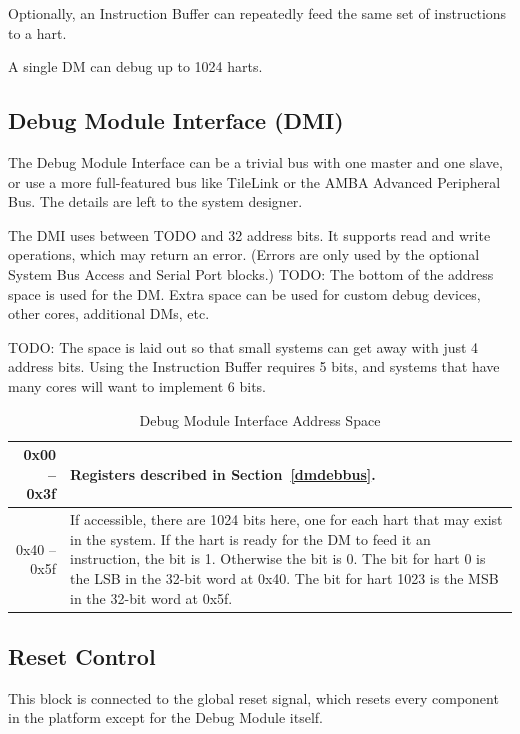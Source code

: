 \documentclass{article}
\begin{document}
Optionally, an Instruction Buffer can repeatedly feed the same set of
instructions to a hart.

A single DM can debug up to 1024 harts.

\subsection{Debug Module Interface (DMI)}

The Debug Module Interface can be a trivial bus with one master and one slave,
or use a more full-featured bus like TileLink or the AMBA Advanced Peripheral
Bus. The details are left to the system designer.

The DMI uses between TODO and 32 address bits.  It supports read and write
operations, which may return an error. (Errors are only used by the optional
System Bus Access and Serial Port blocks.) TODO: The bottom of the address space is
used for the DM. Extra space can be used for custom debug devices, other cores,
additional DMs, etc.

TODO: The space is laid out so that small systems can get away with just 4
address bits. Using the Instruction Buffer requires 5 bits, and systems that
have many cores will want to implement 6 bits.

\begin{table}[htp]
    \centering
    \caption{Debug Module Interface Address Space}
    \label{tab:header}
    \begin{tabulary}{\textwidth}{|r|L|}
        \hline
        0x00 -- 0x3f & Registers described in Section~\ref{dmdebbus}. \\
        \hline
        0x40 -- 0x5f & If accessible, there are 1024 bits here, one for each
        hart that may exist in the system. If the hart is ready for the DM to
        feed it an instruction, the bit is 1. Otherwise the bit is 0. The bit
        for hart 0 is the LSB in the 32-bit word at 0x40. The bit for hart 1023
        is the MSB in the 32-bit word at 0x5f. \\
        \hline
    \end{tabulary}
\end{table}

\subsection{Reset Control} \label{reset}

This block is connected to the global reset signal, which resets every
component in the platform except for the Debug Module itself.
\end{document}
